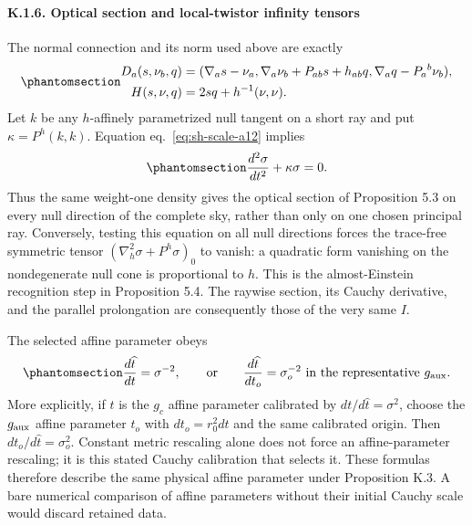 \documentclass[
  english,
  11pt,
  reqno]{amsart}
\begin{document}
\protect{}\label{sec:sh-scale-6}

\paragraph{K.1.6. Optical section and local-twistor infinity
tensors}\label{k.1.6.-optical-section-and-local-twistor-infinity-tensors}

The normal connection and its norm used above are exactly
\begin{equation}\protect\phantomsection\label{eq:sh-scale-a27}{
\begin{aligned}
D_a(s,\nu_b,q)
&=(\nabla_as-\nu_a,
\nabla_a\nu_b+P_{ab}s+h_{ab}q,
\nabla_aq-P_a{}^b\nu_b),\\
H(s,\nu,q)&=2sq+h^{-1}(\nu,\nu).
\end{aligned}
}\end{equation} Let \(k\) be any \(h\)-affinely parametrized null
tangent on a short ray and put \(\kappa=P^h(k,k)\). Equation
eq.~\ref{eq:sh-scale-a12} implies
\begin{equation}\protect\phantomsection\label{eq:sh-scale-a28}{
\frac{d^2\sigma}{dt^2}+\kappa\sigma=0.
}\end{equation} Thus the same weight-one density gives the optical
section of Proposition 5.3 on every null direction of the complete sky,
rather than only on one chosen principal ray. Conversely, testing this
equation on all null directions forces the trace-free symmetric tensor
\((\nabla_h^2\sigma+P^h\sigma)_0\) to vanish: a quadratic form vanishing
on the nondegenerate null cone is proportional to \(h\). This is the
almost-Einstein recognition step in Proposition 5.4. The raywise
section, its Cauchy derivative, and the parallel prolongation are
consequently those of the very same \(I\).

The selected affine parameter obeys
\begin{equation}\protect\phantomsection\label{eq:sh-scale-a29}{
\frac{d\widehat t}{dt}=\sigma^{-2},
\qquad\text{or}\qquad
\frac{d\widehat t}{dt_o}=\sigma_o^{-2}
\text{ in the representative }g_{\rm aux}.
}\end{equation} More explicitly, if \(t\) is the \(g_c\) affine
parameter calibrated by \(dt/d\widehat t=\sigma^2\), choose the
\(g_{\rm aux}\) affine parameter \(t_o\) with \(dt_o=r_0^2dt\) and the
same calibrated origin. Then \(dt_o/d\widehat t=\sigma_o^2\). Constant
metric rescaling alone does not force an affine-parameter rescaling; it
is this stated Cauchy calibration that selects it. These formulas
therefore describe the same physical affine parameter under Proposition
K.3. A bare numerical comparison of affine parameters without their
initial Cauchy scale would discard retained data.
\end{document}
